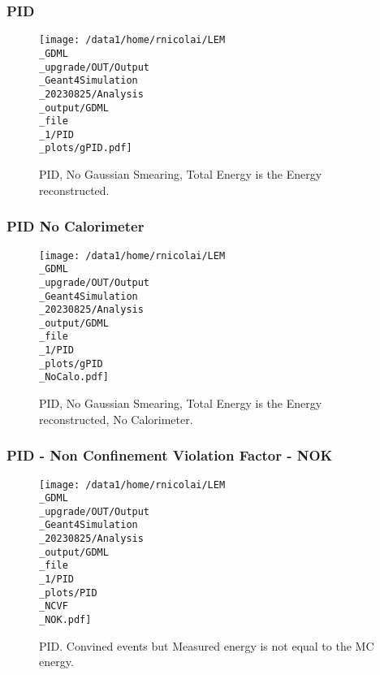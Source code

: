 \documentclass[8pt]{beamer}
\begin{document}
\begin{frame}
\begin{table}
\begin{tabular}{lll}
            \bottomrule
            \end{tabular}
            \end{table}
            
            \end{frame}
            
            \begin{frame}
                \frametitle{PID}
            
        \begin{figure}[h]
            \centering
            \texttt{[image: /data1/home/rnicolai/LEM\\\_GDML\\\_upgrade/OUT/Output\\\_Geant4Simulation\\\_20230825/Analysis\\\_output/GDML\\\_file\\\_1/PID\\\_plots/gPID.pdf]}
            \caption{PID, No Gaussian Smearing, Total Energy is the Energy reconstructed.}
        \end{figure}
        
            \end{frame}
            
            \begin{frame}
                \frametitle{PID No Calorimeter}
            
        \begin{figure}[h]
            \centering
            \texttt{[image: /data1/home/rnicolai/LEM\\\_GDML\\\_upgrade/OUT/Output\\\_Geant4Simulation\\\_20230825/Analysis\\\_output/GDML\\\_file\\\_1/PID\\\_plots/gPID\\\_NoCalo.pdf]}
            \caption{PID, No Gaussian Smearing, Total Energy is the Energy reconstructed, No Calorimeter.}
        \end{figure}
        
            \end{frame}
            
            \begin{frame}
                \frametitle{PID - Non Confinement Violation Factor - NOK}
            
        \begin{figure}[h]
            \centering
            \texttt{[image: /data1/home/rnicolai/LEM\\\_GDML\\\_upgrade/OUT/Output\\\_Geant4Simulation\\\_20230825/Analysis\\\_output/GDML\\\_file\\\_1/PID\\\_plots/PID\\\_NCVF\\\_NOK.pdf]}
            \caption{PID. Convined events but Measured energy is not equal to the MC energy.}
        \end{figure}
        
            \end{frame}
            
\end{document}
